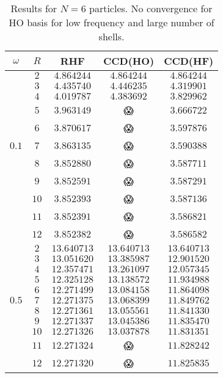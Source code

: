 \documentclass[
    a4paper, aps, twocolumn, floatfix, superscriptaddress,
    nofootinbib]{revtex4-1}
\newcommand{\nan}{\DejaSans 😱}
\newcommand{\1}{\mathds{1}}
\begin{document}
    \begin{table}
        \centering
        \caption{Results for $N = 6$ particles. No convergence for HO
            basis for low frequency and large number of shells.}
        \begin{ruledtabular}
            \begin{tabular}{c|c|ccc}
                $\omega$ & $R$ & RHF & CCD(HO) & CCD(HF) \\ \hline
                         &  $2$  & $4.864244$ & $4.864244$ & $4.864244$ \\
                         &  $3$  & $4.435740$ & $4.446235$ & $4.319901$ \\
                         &  $4$  & $4.019787$ & $4.383692$ & $3.829962$ \\
                         &  $5$  & $3.963149$ & \nan & $3.666722$ \\
                         &  $6$  & $3.870617$ & \nan & $3.597876$ \\
                  $0.1$  &  $7$  & $3.863135$ & \nan & $3.590388$ \\
                         &  $8$  & $3.852880$ & \nan & $3.587711$ \\
                         &  $9$  & $3.852591$ & \nan & $3.587291$ \\
                         &  $10$ & $3.852393$ & \nan & $3.587136$ \\
                         &  $11$ & $3.852391$ & \nan & $3.586821$ \\
                         &  $12$ & $3.852382$ & \nan & $3.586582$ \\ \hline

                         &  $2$  & $13.640713$ & $13.640713$ & $13.640713$ \\
                         &  $3$  & $13.051620$ & $13.385987$ & $12.901520$ \\
                         &  $4$  & $12.357471$ & $13.261097$ & $12.057345$ \\
                         &  $5$  & $12.325128$ & $13.138572$ & $11.934988$ \\
                         &  $6$  & $12.271499$ & $13.084158$ & $11.864098$ \\
                  $0.5$  &  $7$  & $12.271375$ & $13.068399$ & $11.849762$ \\
                         &  $8$  & $12.271361$ & $13.055561$ & $11.841330$ \\
                         &  $9$  & $12.271337$ & $13.045386$ & $11.835470$ \\
                         &  $10$ & $12.271326$ & $13.037878$ & $11.831351$ \\
                         &  $11$ & $12.271324$ & \nan & $11.828242$ \\
                         &  $12$ & $12.271320$ & \nan & $11.825835$ \\ \hline


\end{tabular}
\end{ruledtabular}
\end{table}
\end{document}
